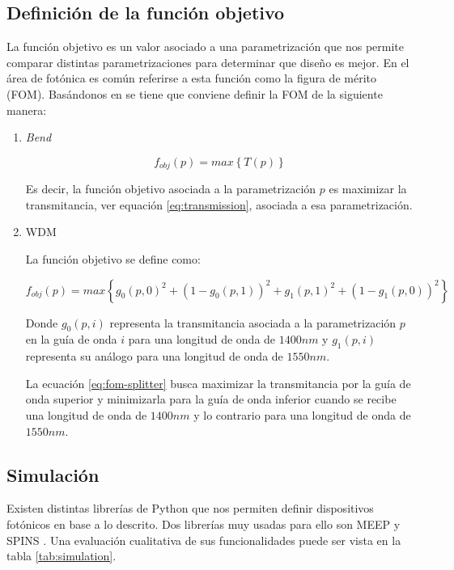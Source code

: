 \subsection{Definición de la función objetivo}

La función objetivo es un valor asociado a una parametrización que nos permite comparar distintas parametrizaciones para determinar que diseño es mejor. 
En el área de fotónica es común referirse a esta función como la figura de mérito (FOM). 
Basándonos en \cite{Su2020} se tiene que conviene definir la FOM de la siguiente manera:

\begin{enumerate}

\item \emph{Bend}

\begin{equation}
  f_{obj}(p) = max \left \{ T(p) \right \}
\label{eq:fom-bend}
\end{equation}

Es decir, la función objetivo asociada a la parametrización $p$ es maximizar la transmitancia, ver equación \ref{eq:transmission}, asociada a esa parametrización.

\item WDM

La función objetivo se define como:

\begin{equation}
  f_{obj}(p) = max \left \{ g_0(p, 0)^2 + (1 - g_0(p, 1))^2 + g_1(p, 1)^2 + (1 - g_1(p, 0))^2 \right \}
\label{eq:fom-splitter}
\end{equation}

Donde $g_0(p, i)$ representa la transmitancia asociada a la parametrización $p$ en la guía de onda $i$ para una longitud de onda de $1400 nm$ y 
      $g_1(p, i)$ representa su análogo para una longitud de onda de $1550 nm$.

La ecuación \ref{eq:fom-splitter} busca maximizar la transmitancia por la guía de onda superior y minimizarla para la guía de onda inferior cuando se recibe una longitud de onda de $1400 nm$ y lo contrario para una longitud de onda de $1550 nm$.

\end{enumerate}

\subsection{Simulación}

Existen distintas librerías de Python que nos permiten definir dispositivos fotónicos en base a lo descrito. 
Dos librerías muy usadas para ello son MEEP \citep{Oskooi2010} y SPINS \citep{Su2020}. 
Una evaluación cualitativa de sus funcionalidades puede ser vista en la tabla \ref{tab:simulation}.


